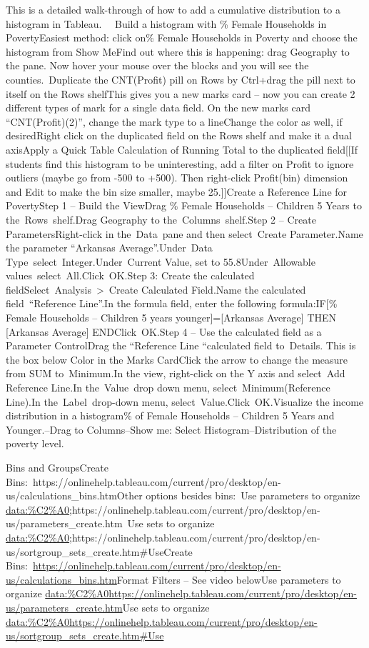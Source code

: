 \documentclass[]{book}
\begin{document}
This is a detailed walk-through of how to add a cumulative distribution to a histogram in Tableau.~ ~Build a histogram with \% Female Households in PovertyEasiest method: click on\% Female Households in Poverty and choose the histogram from Show MeFind out where this is happening: drag Geography to the pane. Now hover your mouse over the blocks and you will see the counties.~Duplicate the CNT(Profit) pill on Rows by Ctrl+drag the pill next to itself on the Rows shelfThis gives you a new marks card -- now you can create 2 different types of mark for a single data field. On the new marks card ``CNT(Profit)(2)'', change the mark type to a lineChange the color as well, if desiredRight click on the duplicated field on the Rows shelf and make it a dual axisApply a Quick Table Calculation of Running Total to the duplicated field{[}{[}If students find this histogram to be uninteresting, add a filter on Profit to ignore outliers (maybe go from -500 to +500). Then right-click Profit(bin) dimension and Edit to make the bin size smaller, maybe 25.{]}{]}Create a Reference Line for PovertyStep 1 -- Build the ViewDrag \% Female Households -- Children 5 Years to the~Rows~shelf.Drag Geography to the~Columns~shelf.Step 2 -- Create ParametersRight-click in the~Data~pane and then select~Create Parameter.Name the parameter ``Arkansas Average''.Under~Data Type~select~Integer.Under~Current Value, set to 55.8Under~Allowable values~select~All.Click~OK.Step 3: Create the calculated fieldSelect~Analysis~\textgreater{}~Create Calculated Field.Name the calculated field~``Reference Line''.In the formula field, enter the following formula:IF{[}\% Female Households -- Children 5 years younger{]}={[}Arkansas Average{]} THEN {[}Arkansas Average{]} ENDClick~OK.Step 4 -- Use the calculated field as a Parameter ControlDrag the ``Reference Line ``calculated field to~Details. This is the box below Color in the Marks CardClick the arrow to change the measure from SUM to~Minimum.In the view, right-click on the Y axis and select~Add Reference Line.In the~Value~drop down menu, select~Minimum(Reference Line).In the~Label~drop-down menu, select~Value.Click~OK.Visualize the income distribution in a histogram\% of Female Households -- Children 5 Years and Younger.--Drag to Columns--Show me: Select Histogram--Distribution of the poverty level.

Bins and GroupsCreate Bins:~https://onlinehelp.tableau.com/current/pro/desktop/en-us/calculations\_bins.htmOther options besides bins:~Use parameters to organize \url{data:\%C2\%A0};https://onlinehelp.tableau.com/current/pro/desktop/en-us/parameters\_create.htm~Use sets to organize \url{data:\%C2\%A0};https://onlinehelp.tableau.com/current/pro/desktop/en-us/sortgroup\_sets\_create.htm\#UseCreate Bins:~\url{https://onlinehelp.tableau.com/current/pro/desktop/en-us/calculations_bins.htm}Format Filters -- See video belowUse parameters to organize \url{data:\%C2\%A0https://onlinehelp.tableau.com/current/pro/desktop/en-us/parameters_create.htm}Use sets to organize \url{data:\%C2\%A0https://onlinehelp.tableau.com/current/pro/desktop/en-us/sortgroup_sets_create.htm\#Use}
\end{document}
